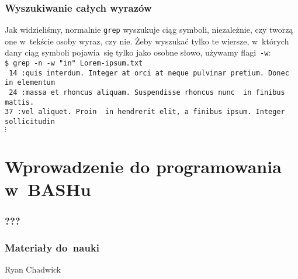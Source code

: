 \documentclass[10pt,t]{beamer}
\begin{document}
\begin{frame}
  \frametitle{Wyszukiwanie całych wyrazów}


  Jak widzieliśmy, normalnie \texttt{grep} wyszukuje ciąg symboli,
  niezależnie, czy tworzą one w~tekście osoby wyraz, czy nie. Żeby
  wyszukać tylko te wiersze, w~których dany ciąg symboli pojawia~się
  tylko jako osobne słowo, używamy flagi~\texttt{-w}: \\
  \texttt{\$ grep -n -w "in"{} Lorem-ipsum.txt} \\
  \texttt{{\color{green} 14}{\color{jAxisBlue} :}quis interdum. Integer at
    orci at neque pulvinar pretium. Donec {\color{red} in} elementum} \\
  \texttt{{\color{green} 24}{\color{jAxisBlue} :}massa et rhoncus aliquam.
    Suspendisse rhoncus nunc {\color{red} in} finibus mattis.} \\
  \texttt{{\color{green}37}{\color{jAxisBlue} :}vel aliquet. Proin
    {\color{red} in} hendrerit elit, a finibus ipsum. Integer
    sollicitudin} \\
  \hspace{1em} $\vdots$ \\

\end{frame}










\section{Wprowadzenie do programowania w~BASHu}


\begin{frame}
  \frametitle{???}




\end{frame}





\begin{frame}
  \frametitle{Materiały do~nauki}


  Ryan Chadwick
  \parencite{Chadwick-BASH-Scripting-Tutorial-Introduction-ETC-Ver-2025}

\end{frame}
\end{document}
